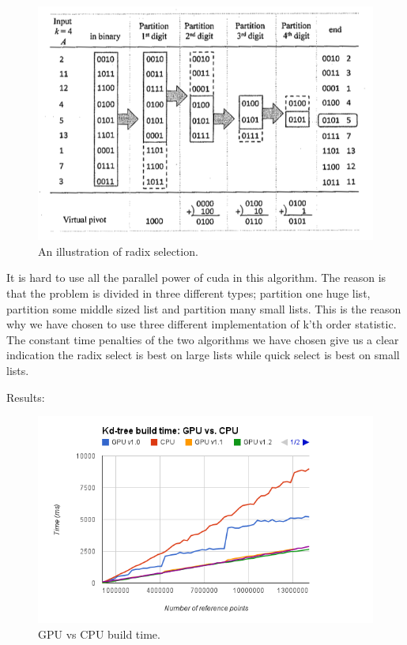 \begin{figure}[ht!]
\centering
\includegraphics[width=120mm]{../gfx/Radix_select.png}

\caption{An illustration of radix selection.}
\label{fig:radix_select}
\end{figure}

It is hard to use all the parallel power of cuda in this algorithm. The reason is that the problem is divided in three different types; partition one huge list, partition some middle sized list and partition many small lists. This is the reason why we have chosen to use three different implementation of k'th order statistic. The constant time penalties of the two algorithms we have chosen give us a clear indication the radix select is best on large lists while quick select is best on small lists.

Results:
\begin{figure}[ht!]
\centering
\includegraphics[width=120mm]{../gfx/gpu-vs-cpu-build-time.png}

\caption{GPU vs CPU build time.}
\label{fig:sublime_ide}
\end{figure}

